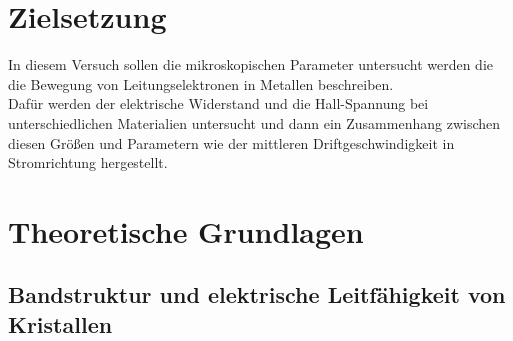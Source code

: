 \section{Zielsetzung}
In diesem Versuch sollen die mikroskopischen Parameter untersucht werden
die die Bewegung von Leitungselektronen in Metallen beschreiben.\\
Dafür werden der elektrische Widerstand und die Hall-Spannung bei unterschiedlichen Materialien 
untersucht und dann ein Zusammenhang zwischen diesen Größen und Parametern wie der mittleren Driftgeschwindigkeit in Stromrichtung hergestellt.



\section{Theoretische Grundlagen}

\subsection{Bandstruktur und elektrische Leitfähigkeit von Kristallen}

